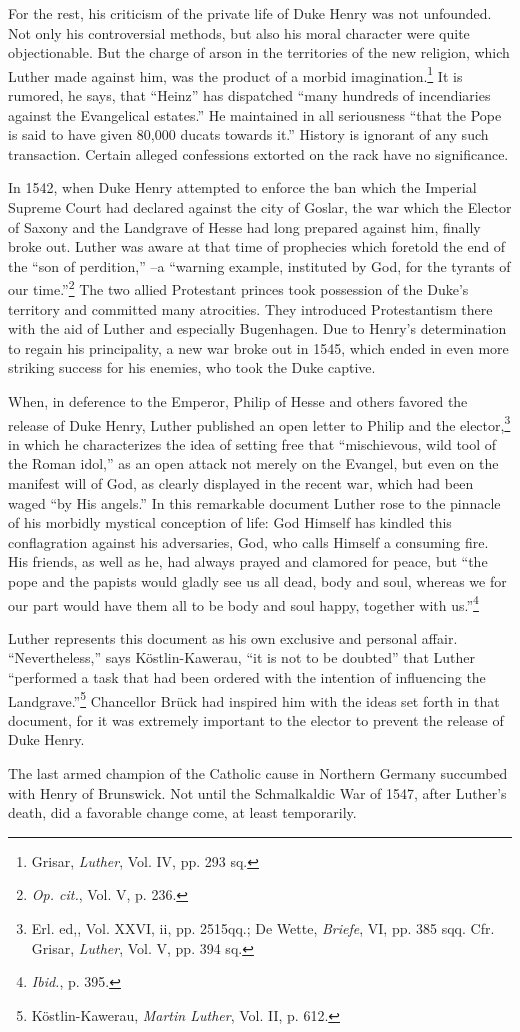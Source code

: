 For the rest, his criticism of the private life of Duke Henry was
not unfounded. Not only his controversial methods, but also his
moral character were quite objectionable. But the charge of arson in
the territories of the new religion, which Luther made against him,
was the product of a morbid imagination.\footnote{Grisar, \textit{Luther}, Vol. IV, pp. 293 sq.}
 It is rumored, he says, that
“Heinz” has dispatched “many hundreds of incendiaries against the
Evangelical estates.” He maintained in all seriousness “that the Pope
is said to have given 80,000 ducats towards it.” History is ignorant
of any such transaction. Certain alleged confessions extorted on the
rack have no significance.

In 1542, when Duke Henry attempted to enforce the ban which
the Imperial Supreme Court had declared against the city of Goslar,
the war which the Elector of Saxony and the Landgrave of Hesse had
long prepared against him, finally broke out. Luther was aware at
that time of prophecies which foretold the end of the “son of perdition,”
--a “warning example, instituted by God, for the tyrants
of our time.”\footnote{\textit{Op. cit.}, Vol. V, p. 236.}
 The two allied Protestant princes took possession of
the Duke’s territory and committed many atrocities. They introduced
Protestantism there with the aid of Luther and especially Bugenhagen.
Due to Henry’s determination to regain his principality, a new war
broke out in 1545, which ended in even more striking success for his
enemies, who took the Duke captive.

When, in deference to the Emperor, Philip of Hesse and others
favored the release of Duke Henry, Luther published an open letter
to Philip and the elector,\footnote
{Erl. ed,, Vol. XXVI, ii, pp. 2515qq.; De Wette, \textit{Briefe}, VI, pp. 385 sqq. Cfr. Grisar,
\textit{Luther}, Vol. V, pp. 394 sq.}
in which he characterizes the idea of
setting free that “mischievous, wild tool of the Roman idol,” as an
open attack not merely on the Evangel, but even on the manifest will of
God, as clearly displayed in the recent war, which had
been waged “by His angels.” In this remarkable document Luther
rose to the pinnacle of his morbidly mystical conception of life: God
Himself has kindled this conflagration against his adversaries, God,
who calls Himself a consuming fire. His friends, as well as he, had
always prayed and clamored for peace, but “the pope and the papists
would gladly see us all dead, body and soul, whereas we for our part
would have them all to be body and soul happy, together with us.”\footnote{\textit{Ibid.}, p. 395.}

Luther represents this document as his own exclusive and personal affair.
“Nevertheless,” says Köstlin-Kawerau, “it is not to be doubted”
that Luther “performed a task that had been ordered with the intention
of influencing the Landgrave.”\footnote{Köstlin-Kawerau, \textit{Martin Luther}, Vol. II, p. 612.}
Chancellor Brück had inspired
him with the ideas set forth in that document, for it was extremely important
to the elector to prevent the release of Duke Henry.

The last armed champion of the Catholic cause in Northern Germany succumbed
with Henry of Brunswick. Not until the Schmalkaldic War of 1547, after
Luther’s death, did a favorable change
come, at least temporarily.
